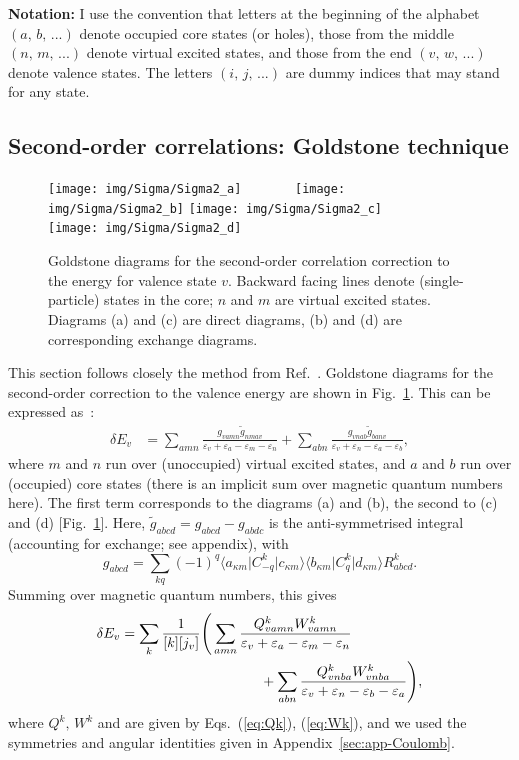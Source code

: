 \documentclass[10pt,twocolumn,a4paper]{article}%
\newcommand{\bra}[1]{\ensuremath{\langle #1|}}	%
\newcommand{\ket}[1]{\ensuremath{|#1\rangle}}	%
\newcommand{\be}{\begin{equation}}
\newcommand{\ee}{\end{equation}}
\def\en{\ensuremath{\varepsilon}}
\renewcommand{\k}{\ensuremath{\kappa}}
\begin{document}
{\bf Notation:} I use the convention that letters at the beginning of the alphabet {${(a,\,b,\,...)}$} denote occupied core states (or holes),
those from the middle {${(n,\,m,\,...)}$} denote virtual excited states, and
those from the end {${(v,\,w,\,...)}$} denote valence states.
The letters {${(i,\,j,\,...)}$} are dummy indices that may stand for any state.



\subsection{Second-order correlations: Goldstone technique}

\begin{figure}%
\centering\tiny
\texttt{[image: img/Sigma/Sigma2\_a]}~~~~~~~
\texttt{[image: img/Sigma/Sigma2\_b]}
\texttt{[image: img/Sigma/Sigma2\_c]}~~~~~~~
\texttt{[image: img/Sigma/Sigma2\_d]}
\caption{\small Goldstone diagrams for the second-order correlation correction to the energy for valence state $v$. Backward facing lines denote (single-particle) states in the core; $n$ and $m$ are virtual excited states. Diagrams (a) and (c) are direct diagrams, (b) and (d) are corresponding exchange diagrams.\label{fig:Sigma2}}
\end{figure}

This section follows closely the method from Ref.~\cite{DzubaHFS1984}.
Goldstone diagrams for the second-order correction to the valence energy are shown in Fig.~\ref{fig:Sigma2}.
This can be expressed as~\cite{DzubaHFS1984,JohnsonBook2007}:
\begin{align}\label{eq:dE-SO}
\delta E_v &= 
\sum_{amn}
\frac{g_{vamn}\widetilde g_{nmav}}{\en_v+\en_a - \en_m-\en_n}
+\sum_{abn}
 \frac{g_{vnab}\widetilde g_{banv}}{\en_v+\en_n-\en_a-\en_b}  ,
\end{align}
where $m$ and $n$ run over (unoccupied) virtual excited states, and $a$ and $b$ run over (occupied) core states (there is an implicit sum over magnetic quantum numbers here).
The first term corresponds to the diagrams (a) and (b), the second to (c) and (d) [Fig.~\ref{fig:Sigma2}].
Here,
$ \widetilde g_{abcd} =  g_{abcd} -  g_{abdc}$ 
is the anti-symmetrised integral (accounting for exchange; see appendix), with
\be
 g_{abcd} = \sum_{kq} (-1)^q \bra{a_{\k m}}C^k_{-q}\ket{c_{\k m}} \bra{b_{\k m}}C^k_{q}\ket{d_{\k m}} R^k_{abcd}.
\ee
Summing over magnetic quantum numbers, this gives~\cite{DzubaHFS1984}
\begin{align}\label{eq:dE-SO}
\delta E_v &=\sum_k \frac{1}{[k][j_v]}\Bigg(
 \sum_{amn} \frac{Q^k_{vamn}W^k_{vamn}}{\en_v+\en_a - \en_m-\en_n}
\notag\\&\qquad\qquad\qquad\qquad\qquad
+\sum_{abn}\frac{Q^k_{vnba}W^k_{vnba}}{\en_v+\en_n-\en_b-\en_a} 
 \Bigg),
\end{align}
where $Q^k,\,W^k$ and are given by Eqs.~(\ref{eq:Qk}), (\ref{eq:Wk}), and 
we used the symmetries and angular identities given in Appendix~\ref{sec:app-Coulomb}.
\end{document}
